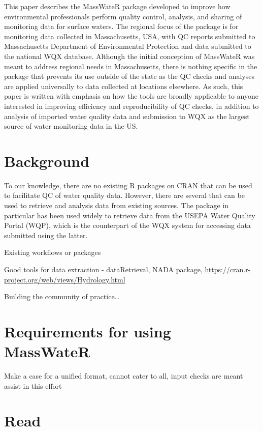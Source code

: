 This paper describes the MassWateR package developed to improve how environmental professionals perform quality control, analysis, and sharing of monitoring data for surface waters. The regional focus of the package is for monitoring data collected in Massachusetts, USA, with QC reports submitted to Massachusetts Department of Environmental Protection and data submitted to the national WQX database. Although the initial conception of MassWateR was meant to address regional needs in Massachusetts, there is nothing specific in the package that prevents its use outside of the state as the QC checks and analyses are applied universally to data collected at locations elsewhere. As such, this paper is written with emphasis on how the tools are broadly applicable to anyone interested in improving efficiency and reproducibility of QC checks, in addition to analysis of imported water quality data and submission to WQX as the largest source of water monitoring data in the US.

\hypertarget{background}{%
\section{Background}\label{background}}

To our knowledge, there are no existing R packages on CRAN that can be used to facilitate QC of water quality data. However, there are several that can be used to retrieve and analysis data from existing sources. The  package in particular has been used widely to retrieve data from the USEPA Water Quality Portal (WQP), which is the counterpart of the WQX system for accessing data submitted using the latter.

Existing workflows or packages

Good tools for data extraction - dataRetrieval, NADA package, \url{https://cran.r-project.org/web/views/Hydrology.html}

Building the community of practice\ldots{}

\hypertarget{requirements-for-using-masswater}{%
\section{Requirements for using MassWateR}\label{requirements-for-using-masswater}}

Make a case for a unified format, cannot cater to all, input checks are meant assist in this effort

\hypertarget{read}{%
\section{Read}\label{read}}

